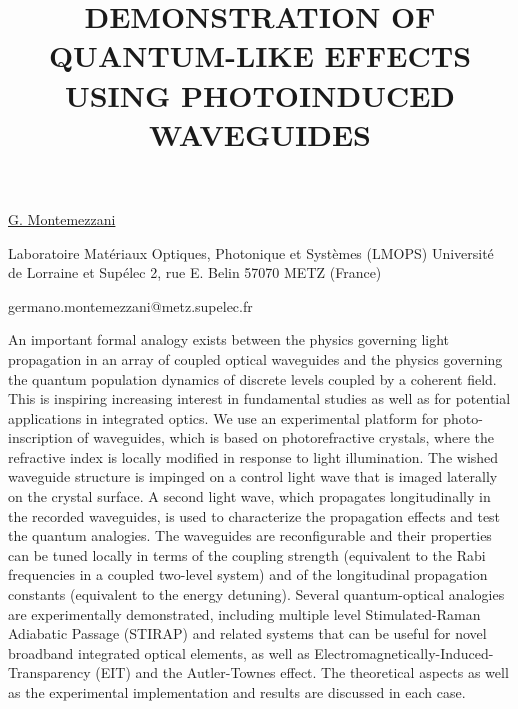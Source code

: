 \title{DEMONSTRATION OF QUANTUM-LIKE EFFECTS USING PHOTOINDUCED WAVEGUIDES}

\underline{G. Montemezzani} 

{\normalsize{\vspace{-4mm}
Laboratoire Mat\'eriaux Optiques, Photonique et Syst\`emes (LMOPS)
Universit\'e de Lorraine et Sup\'elec 2, rue E. Belin
57070 METZ (France)

\email germano.montemezzani@metz.supelec.fr}}

An important formal analogy exists between the physics governing light propagation in an array of coupled optical waveguides and the physics governing the quantum population dynamics of discrete levels coupled by a coherent field. This is inspiring increasing interest in fundamental studies as well as for potential applications in integrated optics.
We use an experimental platform for photo-inscription of waveguides, which is based on photorefractive crystals, where the refractive index is locally modified in response to light illumination. The wished waveguide structure is impinged on a control light wave that is imaged laterally on the crystal surface. A second light wave, which propagates longitudinally in the recorded waveguides, is used to characterize the propagation effects and test the quantum analogies. The waveguides are reconfigurable and their properties can be tuned locally in terms of the coupling strength (equivalent to the Rabi frequencies in a coupled two-level system) and of the longitudinal propagation constants (equivalent to the energy detuning).
Several quantum-optical analogies are experimentally demonstrated, including multiple level Stimulated-Raman Adiabatic Passage (STIRAP) and related systems that can be useful for novel broadband integrated optical elements, as well as Electromagnetically-Induced-Transparency (EIT) and the Autler-Townes effect. The theoretical aspects as well as the experimental implementation and results are discussed in each case.

\vspace{\baselineskip}
